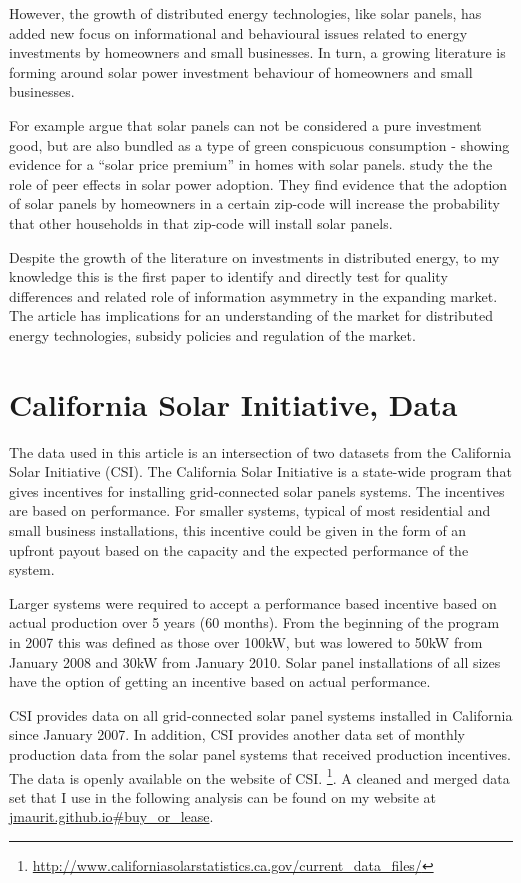 \documentclass[12pt]{article}
\begin{document}
However, the growth of distributed energy technologies, like solar panels, has added new focus on informational and behavioural issues related to energy investments by homeowners and small businesses. In turn, a growing literature is forming around solar power investment behaviour of homeowners and small businesses.

For example \citet{dastrup_understanding_2012} argue that solar panels can not be considered a pure investment good, but are also bundled as a type of green conspicuous consumption - showing evidence for a ``solar price premium'' in homes with solar panels. \citet{bollinger_peer_2012} study the the role of peer effects in solar power adoption. They find evidence that the adoption of solar panels by homeowners in a certain zip-code will increase the probability that other households in that zip-code will install solar panels.

Despite the growth of the literature on investments in distributed energy, to my knowledge this is the first paper to identify and directly test for quality differences and related role of information asymmetry in the expanding market. The article has implications for an understanding of the market for distributed energy technologies, subsidy policies and regulation of the market.

\section{California Solar Initiative, Data}

The data used in this article is an intersection of two datasets from the California Solar Initiative (CSI). The California Solar Initiative is a state-wide program that gives incentives for installing grid-connected solar panels systems. The incentives are based on performance. For smaller systems, typical of most residential and small business installations, this incentive could be given in the form of an upfront payout based on the capacity and the expected performance of the system.

Larger systems were required to accept a performance based incentive based on actual production over 5 years (60 months). From the beginning of the program in 2007 this was defined as those over 100kW, but was lowered to 50kW from January 2008 and 30kW from January 2010. Solar panel installations of all sizes have the option of getting an incentive based on actual performance.

CSI provides data on all grid-connected solar panel systems installed in California since January 2007. In addition, CSI provides another data set of monthly production data from the solar panel systems that received production incentives. The data is openly available on the website of CSI. \footnote{\url{http://www.californiasolarstatistics.ca.gov/current_data_files/}}. A cleaned and merged data set that I use in the following analysis can be found on my website at \url{jmaurit.github.io#buy_or_lease}.
\end{document}
